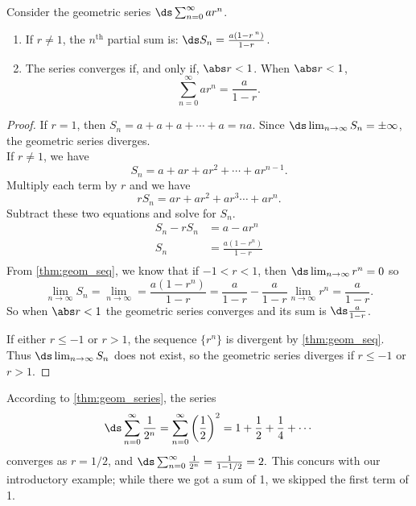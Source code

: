 {Consider the geometric series $\ds \sum_{n=0}^\infty ar^n$.
\begin{enumerate}
\item	If $r\neq1$, the $n^\text{th}$ partial sum is: $\ds S_n = \frac{a(1-r\,^n)}{1-r}$.
\item	The series converges if, and only if, $\abs r<1$. When $\abs r<1$, 
\[\sum_{n=0}^\infty ar^n = \frac{a}{1-r}.\]
\end{enumerate}}

\begin{proof}
If $r=1$, then $S_n=a+a+a+\dotsb+a=na$. Since $\ds\lim_{n\to \infty} S_n=\pm \infty$, the geometric series diverges.\\
If $r\neq 1$, we have
\[S_n=a+ar+ar^2+\dotsb+ar^{n-1}.\]
Multiply each term by $r$ and we have 
\[rS_n=ar+ar^2+ar^3\dotsb+ar^n.\]
Subtract these two equations and solve for $S_n$.
\begin{align*}
S_n-rS_n &=a-ar^n \\
S_n &=\frac{a(1-r^n)}{1-r}\\
\end{align*}
From \autoref{thm:geom_seq}, we know that if $-1<r<1$, then $\ds \lim_{n\to \infty} r^n=0$ so
\[
\lim_{n\to \infty} S_n=\lim_{n\to \infty}=\frac{a(1-r^n)}{1-r}
=\frac{a}{1-r}- \frac{a}{1-r}\lim_{n\to \infty}r^n=\frac{a}{1-r}.
\]
So when $\abs r<1$ the geometric series converges and its sum is $\ds \frac{a}{1-r}$.

If either $r\leq -1$ or $r>1$, the sequence $\{r^n\}$ is divergent by \autoref{thm:geom_seq}. Thus $\ds \lim_{n\to \infty} S_n$ does not exist, so the geometric series diverges if $r\leq -1$ or $r>1$.
\end{proof}

According to \autoref{thm:geom_series}, the series 
\[
\ds\sum_{n=0}^\infty \frac{1}{2^n}
=\sum_{n=0}^\infty \left(\frac 12\right)^2= 1+\frac12+\frac14+\dotsb
\]
converges as $r=1/2$, and $\ds \sum_{n=0}^\infty \frac{1}{2^n} = \frac{1}{1-1/2} = 2.$ This concurs with our introductory example; while there we got a sum of 1, we skipped the first term of 1.\\

